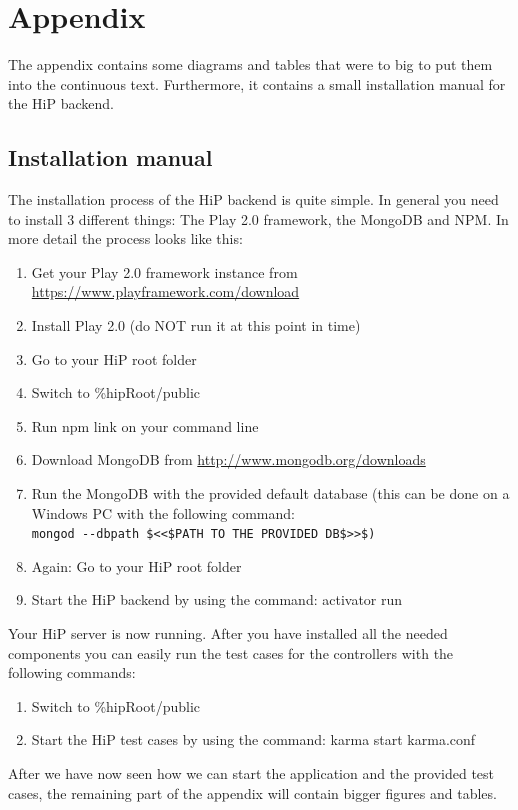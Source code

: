 \chapter{Appendix}
The appendix contains some diagrams and tables that were to big to put them into the continuous text. Furthermore, it contains a small installation manual for the \ac{HiP} backend.

\section{Installation manual}
The installation process of the \ac{HiP} backend is quite simple. In general you need to install 3 different things: The Play 2.0 framework, the MongoDB and \ac{NPM}. In more detail the process looks like this:

\begin{enumerate}
	\item Get your Play 2.0 framework instance from \url{https://www.playframework.com/download}
	\item Install Play 2.0 (do NOT run it at this point in time)
	\item Go to your \ac{HiP} root folder
	\item Switch to \%hipRoot/public
	\item Run npm link on your command line
	\item Download MongoDB from \url{http://www.mongodb.org/downloads}
	\item Run the MongoDB with the provided default database (this can be done on a Windows PC with the following command: \\ \verb|mongod --dbpath $<<$PATH TO THE PROVIDED DB$>>$)|
	\item Again: Go to your \ac{HiP} root folder
	\item	Start the \ac{HiP} backend by using the command: activator run
\end{enumerate}

Your \ac{HiP} server is now running. After you have installed all the needed components you can easily run the test cases for the controllers with the following commands:

\begin{enumerate}
	\item Switch to \%hipRoot/public
	\item	Start the \ac{HiP} test cases by using the command: karma start karma.conf
\end{enumerate}

After we have now seen how we can start the application and the provided test cases, the remaining part of the appendix will contain bigger figures and tables.

